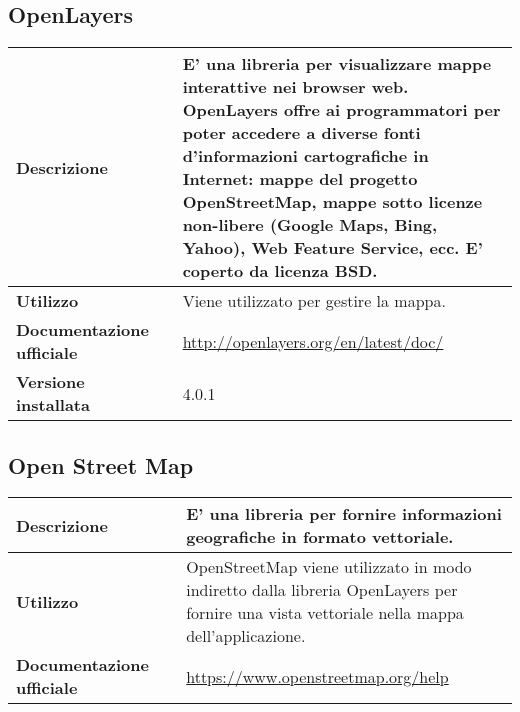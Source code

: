 \subsection{OpenLayers}
\label{OpenLayers}
\begin{table}[H]
	\centering
	\begin{tabular}{p{2cm}p{0.5cm}p{11.5cm}}
		\arrayrulecolor{lightgray}
		\toprule
		\textbf{Descrizione} & &
		E' una libreria \js{} per visualizzare mappe interattive nei browser web.
		OpenLayers offre \glo{API}{API} ai programmatori per poter accedere a diverse fonti d'informazioni cartografiche in Internet: mappe del progetto OpenStreetMap, mappe sotto licenze non-libere (Google Maps, Bing, Yahoo), Web Feature Service, ecc. E' coperto da licenza BSD.
		\\ \midrule
		\textbf{Utilizzo} & &
		Viene utilizzato per gestire la mappa.
		\\ \midrule
		\textbf{Documentazione ufficiale} & &
		\url{http://openlayers.org/en/latest/doc/}
		\\ \midrule
		\textbf{Versione installata} & &
		4.0.1
		\\ \bottomrule
	\end{tabular}
\end{table}

\vspace{40px}
\subsection{Open Street Map}
\label{Open Street Map}
\begin{table}[H]
	\centering
	\begin{tabular}{p{2cm}p{0.5cm}p{11.5cm}}
		\arrayrulecolor{lightgray}
		\toprule
		\textbf{Descrizione} & &
		E' una libreria \js{} per fornire informazioni geografiche in formato vettoriale.
		\\ \midrule
		\textbf{Utilizzo} & &
		OpenStreetMap viene utilizzato in modo indiretto dalla libreria OpenLayers per fornire una vista
		vettoriale nella mappa dell'applicazione.
		\\ \midrule
		\textbf{Documentazione ufficiale} & &
		\url{https://www.openstreetmap.org/help}
		\\\bottomrule
	\end{tabular}
\end{table}

\vspace{40px}
